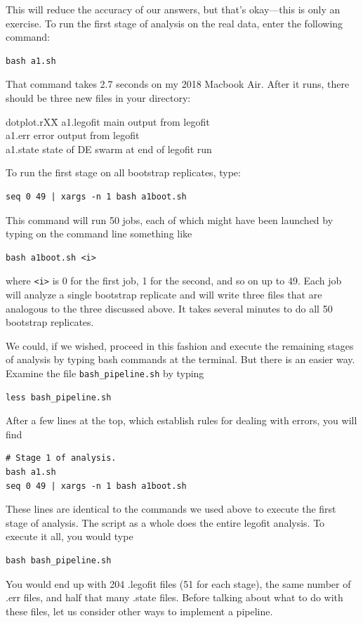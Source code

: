 \documentclass[11pt]{article}
\newenvironment{leftindent}%
{\begin{list}{}%
         {\setlength{\leftmargin}{2em}}%
         \item[]%
}{\end{list}}
\begin{document}
This will reduce the accuracy of our answers, but that's okay---this
is only an exercise. To run the first stage of analysis on the real
data, enter the following command:
\begin{verbatim}
bash a1.sh
\end{verbatim}
That command takes 2.7 seconds on my 2018 Macbook Air. After it runs,
there should be three new files in your directory:
\begin{leftindent}
  \begin{tabbing}
  dotplot.rXX\=\kill
    a1.legofit \> main output from legofit\\
    a1.err     \> error output from legofit\\
    a1.state   \> state of DE swarm at end of legofit run
  \end{tabbing}
\end{leftindent}
To run the first stage on all bootstrap replicates, type:
\begin{verbatim}
seq 0 49 | xargs -n 1 bash a1boot.sh
\end{verbatim}
This command will run 50 jobs, each of which might have been launched
by typing on the command line something like
\begin{verbatim}
bash a1boot.sh <i>
\end{verbatim}
where \verb|<i>| is 0 for the first job, 1 for the second, and so on
up to 49. Each job will analyze a single bootstrap replicate and will
write three files that are analogous to the three discussed above. It
takes several minutes to do all 50 bootstrap replicates.

We could, if we wished, proceed in this fashion and execute the
remaining stages of analysis by typing bash commands at the
terminal. But there is an easier way. Examine the file
\verb|bash_pipeline.sh| by typing 
\begin{verbatim}
less bash_pipeline.sh
\end{verbatim}
After a few lines at the top, which establish rules for dealing with
errors, you will find
\begin{verbatim}
# Stage 1 of analysis.
bash a1.sh
seq 0 49 | xargs -n 1 bash a1boot.sh
\end{verbatim}
These lines are identical to the commands we used above to execute the
first stage of analysis. The script as a whole does the entire legofit
analysis. To execute it all, you would type
\begin{verbatim}
bash bash_pipeline.sh
\end{verbatim}
You would end up with 204 .legofit files (51 for each stage), the same
number of .err files, and half that many .state files. Before talking
about what to do with these files, let us consider other ways to
implement a pipeline.
\end{document}
